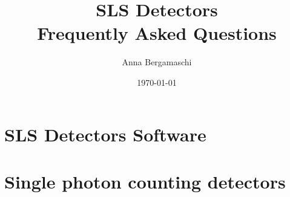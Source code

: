 \documentclass{report}
\begin{document}
\title{SLS Detectors\\ Frequently Asked Questions}
\author{Anna Bergamaschi}
\date{\today}
\maketitle
\tableofcontents
\clearpage
\chapter{SLS Detectors Software}


\begin{comment}
\chapter{General questions about detectors}

\end{comment}

\chapter{Single photon counting detectors}




\begin{comment}
\chapter{Charge Integrating detectors}



\chapter{Angular conversion}

\end{comment}
\end{document}

